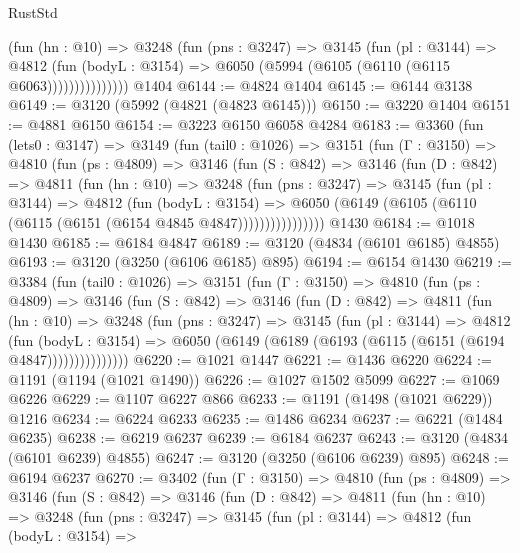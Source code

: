 \begin{lexlean}{RustStd}
\begin{coremodule}
{\begin{coremodule}
{{{{{{{{{{{{{{{{{{{{{{{{{{                  (fun (hn : @10) =>
                  @3248
                    (fun (pns : @3247) =>
                    @3145
                      (fun (pl : @3144) =>
                      @4812
                        (fun (bodyL : @3154) =>
                        @6050 (@5994 (@6105 (@6110 (@6115 @6063)))))))))))))))
    @1404
@6144 := @4824 @1404
@6145 := @6144 @3138
@6149 := @3120 (@5992 (@4821 (@4823 @6145)))
@6150 := @3220 @1404
@6151 := @4881 @6150
@6154 := @3223 @6150 @6058 @4284
@6183 := @3360
    (fun (lets0 : @3147) =>
    @3149
      (fun (tail0 : @1026) =>
      @3151
        (fun (Γ : @3150) =>
        @4810
          (fun (ps : @4809) =>
          @3146
            (fun (S : @842) =>
            @3146
              (fun (D : @842) =>
              @4811
                (fun (hn : @10) =>
                @3248
                  (fun (pns : @3247) =>
                  @3145
                    (fun (pl : @3144) =>
                    @4812
                      (fun (bodyL : @3154) =>
                      @6050 (@6149 (@6105 (@6110 (@6115 (@6151 (@6154 @4845 @4847))))))))))))))))
    @1430
@6184 := @1018 @1430
@6185 := @6184 @4847
@6189 := @3120 (@4834 (@6101 @6185) @4855)
@6193 := @3120 (@3250 (@6106 @6185) @895)
@6194 := @6154 @1430
@6219 := @3384
    (fun (tail0 : @1026) =>
    @3151
      (fun (Γ : @3150) =>
      @4810
        (fun (ps : @4809) =>
        @3146
          (fun (S : @842) =>
          @3146
            (fun (D : @842) =>
            @4811
              (fun (hn : @10) =>
              @3248
                (fun (pns : @3247) =>
                @3145
                  (fun (pl : @3144) =>
                  @4812
                    (fun (bodyL : @3154) =>
                    @6050 (@6149 (@6189 (@6193 (@6115 (@6151 (@6194 @4847)))))))))))))))
@6220 := @1021 @1447
@6221 := @1436 @6220
@6224 := @1191 (@1194 (@1021 @1490))
@6226 := @1027 @1502 @5099
@6227 := @1069 @6226
@6229 := @1107 @6227 @866
@6233 := @1191 (@1498 (@1021 @6229)) @1216
@6234 := @6224 @6233
@6235 := @1486 @6234
@6237 := @6221 (@1484 @6235)
@6238 := @6219 @6237
@6239 := @6184 @6237
@6243 := @3120 (@4834 (@6101 @6239) @4855)
@6247 := @3120 (@3250 (@6106 @6239) @895)
@6248 := @6194 @6237
@6270 := @3402
    (fun (Γ : @3150) =>
    @4810
      (fun (ps : @4809) =>
      @3146
        (fun (S : @842) =>
        @3146
          (fun (D : @842) =>
          @4811
            (fun (hn : @10) =>
            @3248
              (fun (pns : @3247) =>
              @3145
                (fun (pl : @3144) =>
                @4812
                  (fun (bodyL : @3154) =>
}}}}}}}}}}}}}}}}}}}}}}}}}}
\end{coremodule}}
\end{coremodule}
\end{lexlean}
